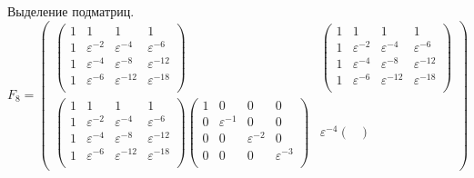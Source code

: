 Выделение подматриц.
\[
    F_8
    = \begin{pmatrix}
          \begin{pmatrix}
              1 & 1                & 1                 & 1                 \\
              1 & \varepsilon^{-2} & \varepsilon^{-4}  & \varepsilon^{-6}  \\
              1 & \varepsilon^{-4} & \varepsilon^{-8}  & \varepsilon^{-12} \\
              1 & \varepsilon^{-6} & \varepsilon^{-12} & \varepsilon^{-18} \\
          \end{pmatrix}
          &
          \begin{pmatrix}
              1 & 1                & 1                 & 1                 \\
              1 & \varepsilon^{-2} & \varepsilon^{-4}  & \varepsilon^{-6}  \\
              1 & \varepsilon^{-4} & \varepsilon^{-8}  & \varepsilon^{-12} \\
              1 & \varepsilon^{-6} & \varepsilon^{-12} & \varepsilon^{-18} \\
          \end{pmatrix} \\
%
          \begin{pmatrix}
              1 & 1                & 1                 & 1                 \\
              1 & \varepsilon^{-2} & \varepsilon^{-4}  & \varepsilon^{-6}  \\
              1 & \varepsilon^{-4} & \varepsilon^{-8}  & \varepsilon^{-12} \\
              1 & \varepsilon^{-6} & \varepsilon^{-12} & \varepsilon^{-18} \\
          \end{pmatrix}
          \begin{pmatrix}
              1 & 0                & 0                & 0                \\
              0 & \varepsilon^{-1} & 0                & 0                \\
              0 & 0                & \varepsilon^{-2} & 0                \\
              0 & 0                & 0                & \varepsilon^{-3} \\
          \end{pmatrix}
          &
          \varepsilon^{-4}
          \begin{pmatrix}

\end{pmatrix}
\end{pmatrix}\]
